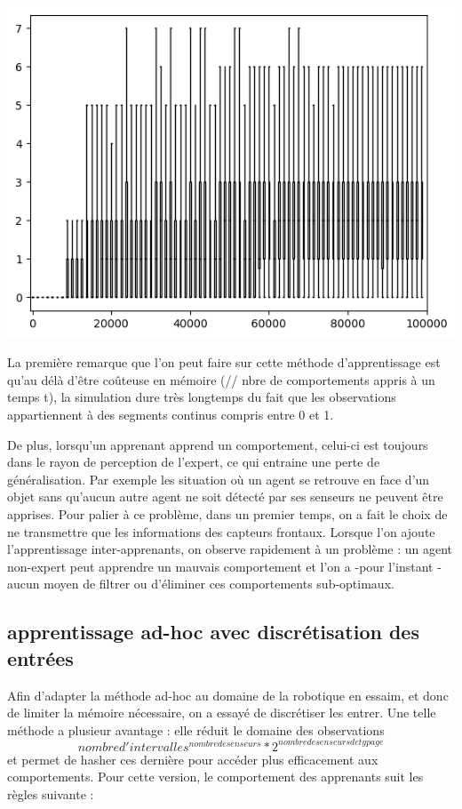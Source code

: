 \documentclass[a4paper, 12pt]{report}
\begin{document}
\includegraphics{learner_boxplot}
	
	La première remarque que l'on peut faire sur cette méthode d'apprentissage est qu'au délà d'être coûteuse en mémoire (// nbre de comportements appris à un temps t), la simulation dure très longtemps du fait que les observations appartiennent à des segments continus compris entre 0 et 1.
	
	De plus, lorsqu'un apprenant apprend un comportement, celui-ci est toujours dans le rayon de perception de l'expert, ce qui entraine une perte de généralisation. Par exemple les situation où un agent se retrouve en face d'un objet sans qu'aucun autre agent ne soit détecté par ses senseurs ne peuvent être apprises.
	Pour palier à ce problème, dans un premier temps, on a fait le choix de ne transmettre que les informations des capteurs frontaux.
	Lorsque l'on ajoute l'apprentissage inter-apprenants, on observe rapidement à un problème : un agent non-expert peut apprendre un mauvais comportement et l'on a -pour l'instant - aucun moyen de filtrer ou d'éliminer ces comportements sub-optimaux.
	
	\subsection{apprentissage ad-hoc avec discrétisation des entrées}
	Afin d'adapter la méthode ad-hoc au domaine de la robotique en essaim, et donc de limiter la mémoire nécessaire, on a essayé de discrétiser les entrer. Une telle méthode a plusieur avantage : elle réduit le domaine des observations $$nombre d'intervalles^{nombre de senseurs}*2^{nombre de senseurs de typage} $$ et permet de hasher ces dernière pour accéder plus efficacement aux comportements.
	Pour cette version, le comportement des apprenants suit les règles suivante :
	
\end{document}
